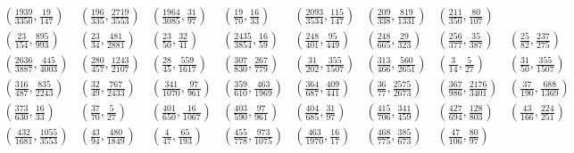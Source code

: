 \documentclass[reqno]{amsart}
\renewcommand{\:}{\colon}
\theoremstyle{definition}
\begin{document}
\[\begin{array}{cccccccc}
  \left(\frac{1939}{3350},\frac{  19}{ 147}\right) &
  \left(\frac{ 196}{ 335},\frac{2719}{3553}\right) &
  \left(\frac{1964}{3085},\frac{  31}{  97}\right) &
  \left(\frac{  19}{  70},\frac{  16}{  33}\right) &
  \left(\frac{2093}{3534},\frac{ 115}{ 147}\right) &
  \left(\frac{ 209}{ 338},\frac{ 819}{1331}\right) &
  \left(\frac{ 211}{ 350},\frac{  80}{ 107}\right)\\
  \left(\frac{  23}{ 154},\frac{ 895}{ 993}\right) &
  \left(\frac{  23}{  34},\frac{ 481}{2881}\right) &
  \left(\frac{  23}{  50},\frac{  32}{  41}\right) &
  \left(\frac{2435}{3854},\frac{  16}{  59}\right) &
  \left(\frac{ 248}{ 401},\frac{  95}{ 449}\right) &
  \left(\frac{ 248}{ 665},\frac{  29}{ 323}\right) &
  \left(\frac{ 256}{ 377},\frac{  35}{ 387}\right) &
  \left(\frac{  25}{  82},\frac{ 237}{ 275}\right)\\
  \left(\frac{2636}{3887},\frac{ 445}{4003}\right) &
  \left(\frac{ 280}{ 457},\frac{1243}{2107}\right) &
  \left(\frac{  28}{  45},\frac{ 559}{1617}\right) &
  \left(\frac{ 307}{ 830},\frac{ 267}{ 779}\right) &
  \left(\frac{  31}{ 202},\frac{ 355}{1507}\right) &
  \left(\frac{ 313}{ 466},\frac{ 560}{2651}\right) &
  \left(\frac{   3}{  14},\frac{   5}{  27}\right) &
  \left(\frac{  31}{  50},\frac{ 355}{1507}\right)\\
  \left(\frac{ 316}{ 487},\frac{ 835}{2243}\right) &
  \left(\frac{  32}{  49},\frac{ 767}{2433}\right) &
  \left(\frac{ 341}{1070},\frac{  97}{ 961}\right) &
  \left(\frac{ 359}{ 610},\frac{ 463}{1969}\right) &
  \left(\frac{ 364}{ 687},\frac{ 409}{ 441}\right) &
  \left(\frac{  36}{  77},\frac{2575}{2673}\right) &
  \left(\frac{ 367}{ 986},\frac{2176}{3401}\right) &
  \left(\frac{  37}{ 190},\frac{ 688}{1369}\right)\\
  \left(\frac{ 373}{ 630},\frac{  16}{  33}\right) &
  \left(\frac{  37}{  70},\frac{   5}{  27}\right) &
  \left(\frac{ 401}{ 650},\frac{  16}{1067}\right) &
  \left(\frac{ 403}{ 590},\frac{  97}{ 961}\right) &
  \left(\frac{ 404}{ 685},\frac{  31}{  97}\right) &
  \left(\frac{ 415}{ 706},\frac{ 341}{ 459}\right) &
  \left(\frac{ 427}{ 694},\frac{ 128}{ 803}\right) &
  \left(\frac{  43}{ 166},\frac{ 224}{ 251}\right)\\
  \left(\frac{ 432}{1681},\frac{1055}{3553}\right) &
  \left(\frac{  43}{  94},\frac{ 480}{1849}\right) &
  \left(\frac{   4}{  47},\frac{  65}{ 193}\right) &
  \left(\frac{ 455}{ 778},\frac{ 973}{1075}\right) &
  \left(\frac{ 463}{1970},\frac{  16}{  17}\right) &
  \left(\frac{ 468}{ 775},\frac{ 385}{ 673}\right) &
  \left(\frac{  47}{ 106},\frac{  80}{  97}\right) &

\end{array}\]
\end{document}
